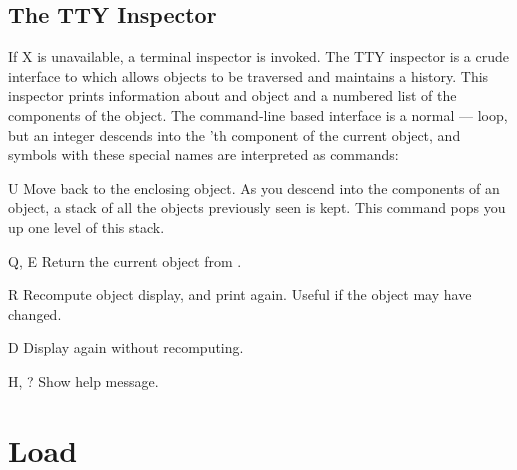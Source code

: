 \subsection{The TTY Inspector}

If X is unavailable, a terminal inspector is invoked.  The TTY inspector
is a crude interface to  which allows objects to be
traversed and maintains a history.  This inspector prints information
about and object and a numbered list of the components of the object.
The command-line based interface is a normal
---- loop, but an integer 
descends into the 'th component of the current object, and
symbols with these special names are interpreted as commands:

\begin{Lentry}
\item[U] Move back to the enclosing object.  As you descend into the
components of an object, a stack of all the objects previously seen is
kept.  This command pops you up one level of this stack.

\item[Q, E] Return the current object from .

\item[R] Recompute object display, and print again.  Useful if the
object may have changed.

\item[D] Display again without recomputing.

\item[H, ?] Show help message.
\end{Lentry}


\section{Load}

